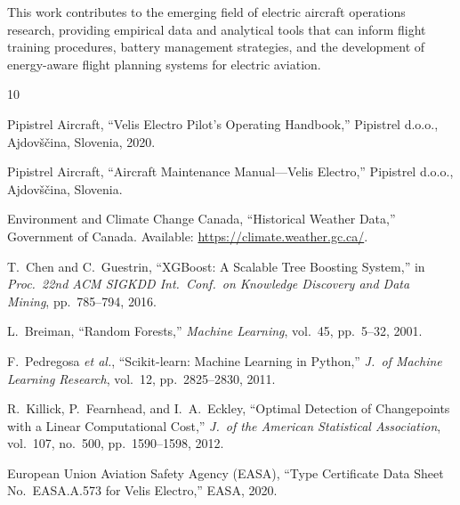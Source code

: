 \documentclass[11pt,a4paper]{article}
\begin{document}
This work contributes to the emerging field of electric aircraft operations research, providing empirical data and analytical tools that can inform flight training procedures, battery management strategies, and the development of energy-aware flight planning systems for electric aviation.

\newpage
\begin{thebibliography}{10}

Pipistrel Aircraft, ``Velis Electro Pilot's Operating Handbook,'' Pipistrel d.o.o., Ajdov\v{s}\v{c}ina, Slovenia, 2020.

Pipistrel Aircraft, ``Aircraft Maintenance Manual---Velis Electro,'' Pipistrel d.o.o., Ajdov\v{s}\v{c}ina, Slovenia.

Environment and Climate Change Canada, ``Historical Weather Data,'' Government of Canada. Available: \url{https://climate.weather.gc.ca/}.

T.~Chen and C.~Guestrin, ``XGBoost: A Scalable Tree Boosting System,'' in \textit{Proc.\ 22nd ACM SIGKDD Int.\ Conf.\ on Knowledge Discovery and Data Mining}, pp.~785--794, 2016.

L.~Breiman, ``Random Forests,'' \textit{Machine Learning}, vol.~45, pp.~5--32, 2001.

F.~Pedregosa \textit{et al.}, ``Scikit-learn: Machine Learning in Python,'' \textit{J.\ of Machine Learning Research}, vol.~12, pp.~2825--2830, 2011.

R.~Killick, P.~Fearnhead, and I.~A.~Eckley, ``Optimal Detection of Changepoints with a Linear Computational Cost,'' \textit{J.\ of the American Statistical Association}, vol.~107, no.~500, pp.~1590--1598, 2012.

European Union Aviation Safety Agency (EASA), ``Type Certificate Data Sheet No.\ EASA.A.573 for Velis Electro,'' EASA, 2020.

\end{thebibliography}
\end{document}
